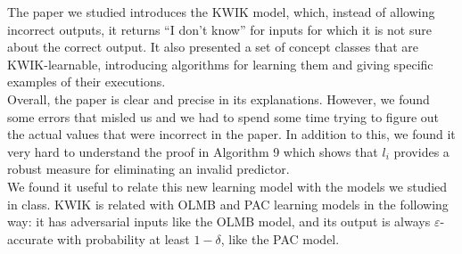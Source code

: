 The paper we studied introduces the KWIK model, which, instead of allowing
incorrect outputs, it returns ``I don't know'' for inputs for which it is not
sure about the correct output. It also presented a set of concept classes that
are KWIK-learnable, introducing algorithms for learning them and giving
specific examples of their executions. \\

Overall, the paper is clear and precise in its explanations. However, we found
some errors that misled us and we had to spend some time trying to figure out
the actual values that were incorrect in the paper. In addition to this, we
found it very hard to understand the proof in Algorithm 9 which shows that $l_i$
provides a robust measure for eliminating an invalid predictor. \\

We found it useful to relate this new learning model with the models we studied in class.
KWIK is related with OLMB and PAC learning models in the following way: it has
adversarial inputs like the OLMB model, and its output is always
$\varepsilon$-accurate with probability at least $1 - \delta$, like the PAC
model. \\

